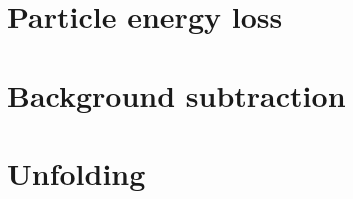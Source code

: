 \section{Particle energy loss}\label{sec:energyLoss}
\section{Background subtraction}\label{sec:bkgdSubtraction}
\section{Unfolding}\label{sec:unfolding}

% 
% 
% 
% 
% 
% 
% 
% 
